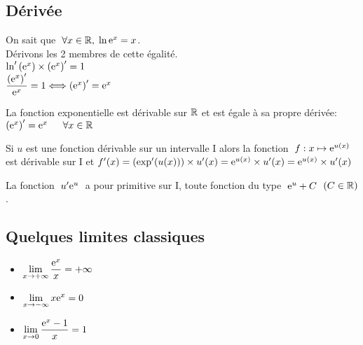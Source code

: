 \subsection*{Dérivée} 
On sait que  $\; \forall x \in \mathbb{R} ,\;  \ln{\mathrm{e}^{x}}=x $. \\
Dérivons les 2 membres de cette égalité.  \\
$ \ln^{\prime}\left( \mathrm{e}^{x}\right)\times \left(\mathrm{e}^{x}\right)^{\prime}=1$ \\
$ \dfrac{\left(\mathrm{e}^{x}\right)^{\prime}}{\mathrm{e}^{x}}=1   \Longleftrightarrow  \left(\mathrm{e}^{x}\right)^{\prime}=\mathrm{e}^{x}$ 

\begin{property}
 La fonction exponentielle est dérivable sur $ \mathbb{R} $ et est égale à sa propre dérivée:
 $ \left( \mathrm{e}^{x}\right)^{\prime}=\mathrm{e}^{x}\;\;  \quad \forall x \in \mathbb{R} $
\end{property}
\begin{corollary}
Si $u$ est une fonction  dérivable sur un intervalle I alors la fonction $\; f: x \mapsto \mathrm{e}^{u(x)} \;$  est dérivable sur I  et  $ f'(x)=\left(\text{exp}^{\prime}(u(x))\right)\times u'(x) = \mathrm{e}^{u(x)}\times u'(x)=\mathrm{e}^{u(x)}\times u'(x)$ 

\end{corollary}

 La fonction  $\;  u^{\prime}\mathrm{e}^{u} \;$  a pour primitive   sur I, toute fonction du type  $\;  \mathrm{e}^{u}+C \; $ $ (C\in\mathbb{R}) $.
 


\subsection{ Quelques limites classiques}

\begin{property}
\begin{itemize}
\item  $\displaystyle \lim_{x \to +\infty}\dfrac{\mathrm{e}^{x}}{x}=+\infty $
\item  $\displaystyle \lim_{x \to -\infty} x\mathrm{e}^{x}=0 $   
\item  $\displaystyle \lim_{x \to 0} \dfrac{\mathrm{e}^{x}-1}{x}=1 $
\end{itemize}
\end{property}


